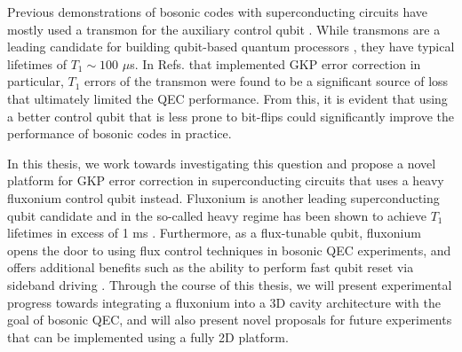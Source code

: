 Previous demonstrations of bosonic codes with superconducting circuits have mostly used a transmon \cite{koch2007charge} for the auxiliary control qubit \cite{ofek2016extending, hu2019quantum, gertler2021protecting, campagne2020gkp-expt, sivak2023gkp-expt, nordquantique2023gkp-expt}. While transmons are a leading candidate for building qubit-based quantum processors \cite{krantz2019quantum, kjaergaard2020superconducting}, they have typical lifetimes of $T_1 \sim 100$ $\mu$s. In Refs. \cite{campagne2020gkp-expt, sivak2023gkp-expt, nordquantique2023gkp-expt} that implemented GKP error correction in particular, $T_1$ errors of the transmon were found to be a significant source of loss that ultimately limited the QEC performance. From this, it is evident that using a better control qubit that is less prone to bit-flips could significantly improve the performance of bosonic codes in practice. 

In this thesis, we work towards investigating this question and propose a novel platform for GKP error correction in superconducting circuits that uses a heavy fluxonium control qubit instead. Fluxonium is another leading superconducting qubit candidate and in the so-called heavy regime has been shown to achieve $T_1$ lifetimes in excess of 1 ms \cite{earnest2018realization, lin2018demonstration, zhang2021universal, ding2023FTF}. Furthermore, as a flux-tunable qubit, fluxonium opens the door to using flux control techniques in bosonic QEC experiments, and offers additional benefits such as the ability to perform fast qubit reset via sideband driving \cite{najera2024high, nie2024parametrically}. Through the course of this thesis, we will present experimental progress towards integrating a fluxonium into a 3D cavity architecture with the goal of bosonic QEC, and will also present novel proposals for future experiments that can be implemented using a fully 2D platform. 

